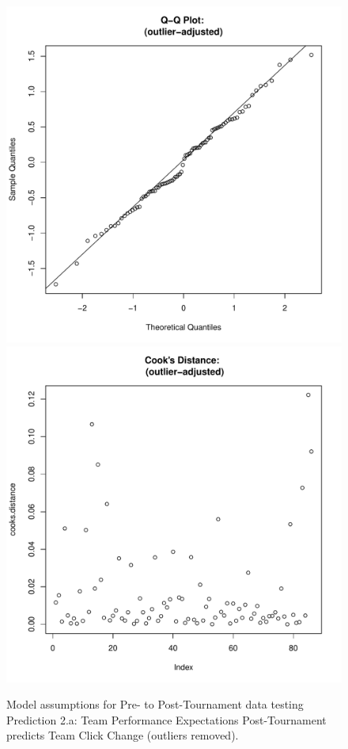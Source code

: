 \begin{CJK}{UTF8}{gbsn}
\begin{figure}[htbp]
         \includegraphics[scale =.4]{images/MLM21bOutQQNorm.pdf}
         \includegraphics[scale =.4]{images/MLM21bOutCooksD.pdf}
         \caption{Model assumptions for Pre- to Post-Tournament data testing Prediction 2.a: Team Performance Expectations Post-Tournament predicts Team Click Change (outliers removed).}
         \label{fig:MLM21bOutAssumptions}
       \end{figure}






\end{CJK}
